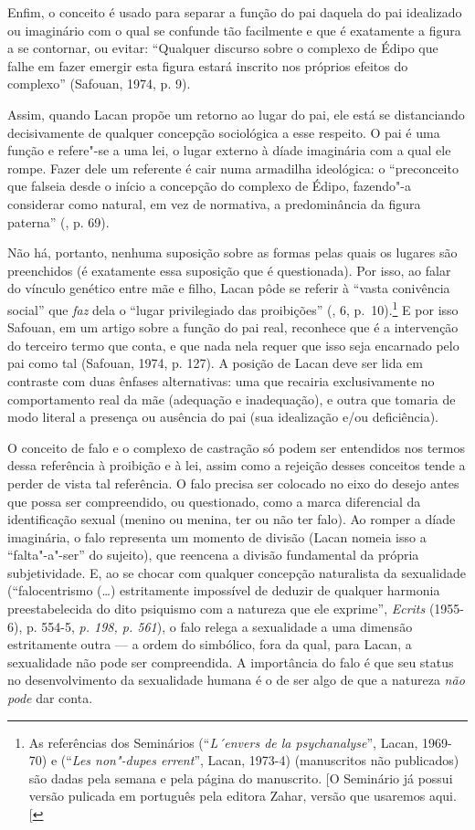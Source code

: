 Enfim, o conceito é usado para separar a função do pai daquela do pai
idealizado ou imaginário com o qual se confunde tão facilmente e que é
exatamente a figura a se contornar, ou evitar: ``Qualquer discurso sobre
o complexo de Édipo que falhe em fazer emergir esta figura estará
inscrito nos próprios efeitos do complexo'' (Safouan, 1974, p. 9).

Assim, quando Lacan propõe um retorno ao lugar do pai, ele está se
distanciando decisivamente de qualquer concepção sociológica a esse
respeito. O pai é uma função e refere"-se a uma lei, o lugar externo à
díade imaginária com a qual ele rompe. Fazer dele um referente é cair
numa armadilha ideológica: o ``preconceito que falseia desde o início a
concepção do complexo de Édipo, fazendo"-a considerar como natural, em
vez de normativa, a predominância da figura paterna'' (, p. 69).

Não há, portanto, nenhuma suposição sobre as formas pelas quais os
lugares são preenchidos (é exatamente essa suposição que é questionada).
Por isso, ao falar do vínculo genético entre mãe e filho, Lacan pôde se
referir à ``vasta conivência social'' que \emph{faz} dela o ``lugar
privilegiado das proibições'' (, 6, p.~10).\footnote{As referências
  dos Seminários  (``\emph{L´envers de la psychanalyse}'', Lacan,
  1969-70) e  (``\emph{Les non"-dupes errent}'', Lacan, 1973-4)
  (manuscritos não publicados) são dadas pela semana e pela página do
  manuscrito. {[}O Seminário  já possui versão pulicada em
  português pela editora Zahar, versão que usaremos aqui. {[}\versal{N.~T.}{]}} E por
isso Safouan, em um artigo sobre a função do pai real, reconhece que é a
intervenção do terceiro termo que conta, e que nada nela requer que isso
seja encarnado pelo pai como tal (Safouan, 1974, p. 127). A posição de
Lacan deve ser lida em contraste com duas ênfases alternativas: uma que
recairia exclusivamente no comportamento real da mãe (adequação e
inadequação), e outra que tomaria de modo literal a presença ou ausência
do pai (sua idealização e/ou deficiência).

O conceito de falo e o complexo de castração só podem ser entendidos nos
termos dessa referência à proibição e à lei, assim como a rejeição
desses conceitos tende a perder de vista tal referência. O falo precisa
ser colocado no eixo do desejo antes que possa ser compreendido, ou
questionado, como a marca diferencial da identificação sexual (menino ou
menina, ter ou não ter falo). Ao romper a díade imaginária, o falo
representa um momento de divisão (Lacan nomeia isso a ``falta"-a"-ser'' do
sujeito), que reencena a divisão fundamental da própria subjetividade.
E, ao se chocar com qualquer concepção naturalista da sexualidade
(``falocentrismo (\ldots{}) estritamente impossível de deduzir de qualquer
harmonia preestabelecida do dito psiquismo com a natureza que ele
exprime'', \emph{Ecrits} (1955-6), p. 554-5, \emph{p. 198, p. 561}), o
falo relega a sexualidade a uma dimensão estritamente outra --- a ordem
do simbólico, fora da qual, para Lacan, a sexualidade não pode ser
compreendida. A importância do falo é que seu status no desenvolvimento
da sexualidade humana é o de ser algo de que a natureza \emph{não pode}
dar conta.

